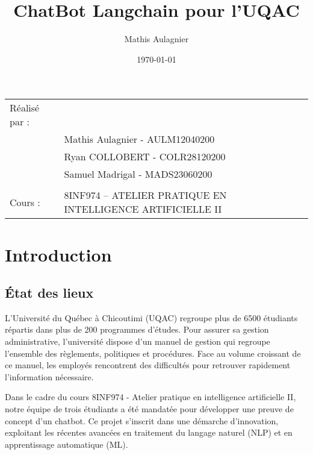 \documentclass{article}
\title{ChatBot Langchain pour l'UQAC}
\author{Mathis Aulagnier}
\date{\today}
\begin{document}
\maketitle
\noindent\begin{tabular}{@{}ll}
    Réalisé par :\\
        & Mathis Aulagnier - AULM12040200 \\
        & Ryan COLLOBERT - COLR28120200 \\
        & Samuel Madrigal - MADS23060200 \\
        \\
    Cours :  &  8INF974 – ATELIER PRATIQUE EN INTELLIGENCE ARTIFICIELLE II \\
\end{tabular}

\section{Introduction}

\subsection{État des lieux}
\quad L'Université du Québec à Chicoutimi (UQAC) regroupe plus de 6500 étudiants répartis dans plus de 200 programmes d'études. Pour assurer sa gestion administrative, l'université dispose d'un manuel de gestion qui regroupe l'ensemble des règlements, politiques et procédures. Face au volume croissant de ce manuel, les employés rencontrent des difficultés pour retrouver rapidement l'information nécessaire.

Dans le cadre du cours 8INF974 - Atelier pratique en intelligence artificielle II, notre équipe de trois étudiants a été mandatée pour développer une preuve de concept d'un chatbot. Ce projet s'inscrit dans une démarche d'innovation, exploitant les récentes avancées en traitement du langage naturel (NLP) et en apprentissage automatique (ML).
\end{document}
